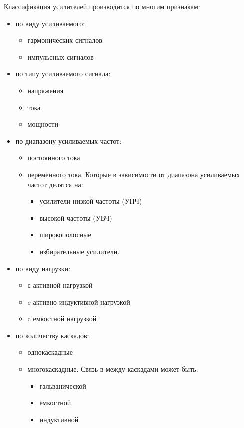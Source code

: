 \documentclass[unicode, 12pt, a4paper, oneside]{article}
\begin{document}
Классификация усилителей производится по многим признакам:
\begin{itemize}
\item по виду усиливаемого:
	\begin{itemize}
	\item гармонических сигналов
	\item импульсных сигналов
	\end{itemize}
\item по типу усиливаемого сигнала:
	\begin{itemize}
	\item напряжения
	\item тока 
	\item мощности
	\end{itemize}
\item по диапазону усиливаемых частот:
	\begin{itemize}
	\item постоянного тока 
	\item переменного тока. Которые в зависимости от диапазона усиливаемых частот делятся на:
		\begin{itemize}
		\item усилители низкой частоты (УНЧ)
		\item высокой частоты (УВЧ)
		\item широкополосные
		\item избирательные усилители.
		\end{itemize}
	\end{itemize}
\item по виду нагрузки:
	\begin{itemize}
	\item с активной нагрузкой
	\item c активно-индуктивной нагрузкой
	\item c емкостной нагрузкой
	\end{itemize}
\item по количеству каскадов:
	\begin{itemize}
	\item однокаскадные 
	\item многокаскадные. Связь в между каскадами может быть:
		\begin{itemize}
		\item гальванической
		\item емкостной
		\item индуктивной
		\end{itemize}
	\end{itemize}
\end{itemize}
\end{document}
